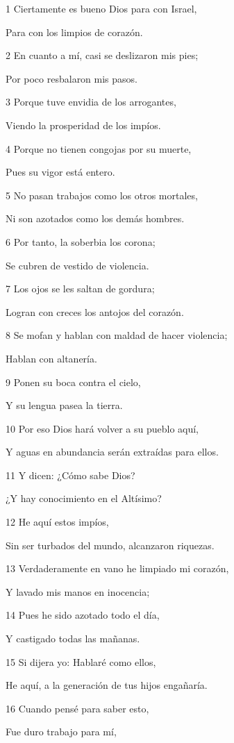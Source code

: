\par 1 Ciertamente es bueno Dios para con Israel,
\par Para con los limpios de corazón.
\par 2 En cuanto a mí, casi se deslizaron mis pies;
\par Por poco resbalaron mis pasos.
\par 3 Porque tuve envidia de los arrogantes,
\par Viendo la prosperidad de los impíos.
\par 4 Porque no tienen congojas por su muerte,
\par Pues su vigor está entero.
\par 5 No pasan trabajos como los otros mortales,
\par Ni son azotados como los demás hombres.
\par 6 Por tanto, la soberbia los corona;
\par Se cubren de vestido de violencia.
\par 7 Los ojos se les saltan de gordura;
\par Logran con creces los antojos del corazón.
\par 8 Se mofan y hablan con maldad de hacer violencia;
\par Hablan con altanería.
\par 9 Ponen su boca contra el cielo,
\par Y su lengua pasea la tierra.
\par 10 Por eso Dios hará volver a su pueblo aquí,
\par Y aguas en abundancia serán extraídas para ellos.
\par 11 Y dicen: ¿Cómo sabe Dios?
\par ¿Y hay conocimiento en el Altísimo?
\par 12 He aquí estos impíos,
\par Sin ser turbados del mundo, alcanzaron riquezas.
\par 13 Verdaderamente en vano he limpiado mi corazón,
\par Y lavado mis manos en inocencia;
\par 14 Pues he sido azotado todo el día,
\par Y castigado todas las mañanas.
\par 15 Si dijera yo: Hablaré como ellos,
\par He aquí, a la generación de tus hijos engañaría.
\par 16 Cuando pensé para saber esto,
\par Fue duro trabajo para mí,
